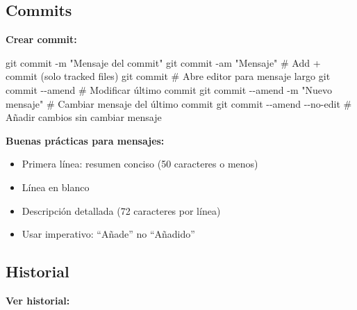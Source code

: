 \documentclass[
  doc,
  floatsintext,
  longtable,
  a4paper,
  nolmodern,
  notxfonts,
  notimes,
  12pt,
  colorlinks=true,linkcolor=blue,citecolor=blue,urlcolor=blue]{apa7}
\newenvironment{Shaded}{\begin{snugshade}}{\end{snugshade}}
\newcommand{\AttributeTok}[1]{\textcolor[rgb]{0.40,0.45,0.13}{#1}}
\newcommand{\CommentTok}[1]{\textcolor[rgb]{0.37,0.37,0.37}{#1}}
\newcommand{\FunctionTok}[1]{\textcolor[rgb]{0.28,0.35,0.67}{#1}}
\newcommand{\NormalTok}[1]{\textcolor[rgb]{0.00,0.23,0.31}{#1}}
\newcommand{\StringTok}[1]{\textcolor[rgb]{0.13,0.47,0.30}{#1}}
\providecommand{\tightlist}{%
  \setlength{\itemsep}{0pt}\setlength{\parskip}{0pt}}
\begin{document}
\subsection{Commits}\label{commits}

\textbf{Crear commit:}

\begin{Shaded}
\begin{Highlighting}[]
\FunctionTok{git}\NormalTok{ commit }\AttributeTok{{-}m} \StringTok{"Mensaje del commit"}
\FunctionTok{git}\NormalTok{ commit }\AttributeTok{{-}am} \StringTok{"Mensaje"}   \CommentTok{\# Add + commit (solo tracked files)}
\FunctionTok{git}\NormalTok{ commit                 }\CommentTok{\# Abre editor para mensaje largo}
\FunctionTok{git}\NormalTok{ commit }\AttributeTok{{-}{-}amend}         \CommentTok{\# Modificar último commit}
\FunctionTok{git}\NormalTok{ commit }\AttributeTok{{-}{-}amend} \AttributeTok{{-}m} \StringTok{"Nuevo mensaje"}  \CommentTok{\# Cambiar mensaje del último commit}
\FunctionTok{git}\NormalTok{ commit }\AttributeTok{{-}{-}amend} \AttributeTok{{-}{-}no{-}edit}  \CommentTok{\# Añadir cambios sin cambiar mensaje}
\end{Highlighting}
\end{Shaded}

\textbf{Buenas prácticas para mensajes:}

\begin{itemize}
\tightlist
\item
  Primera línea: resumen conciso (50 caracteres o menos)
\item
  Línea en blanco
\item
  Descripción detallada (72 caracteres por línea)
\item
  Usar imperativo: ``Añade'' no ``Añadido''
\end{itemize}

\subsection{Historial}\label{historial}

\textbf{Ver historial:}
\end{document}
